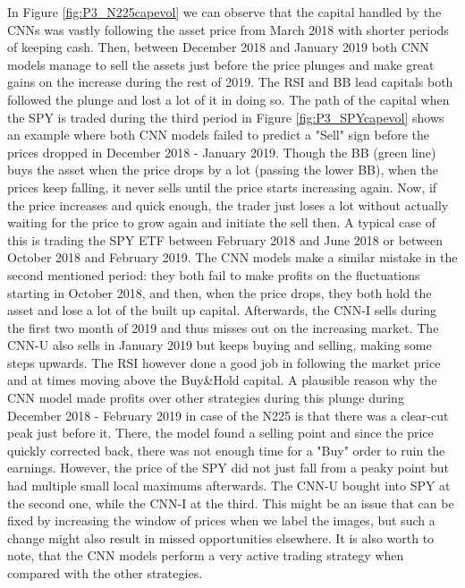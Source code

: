\documentclass[11pt, a4paper]{article}
\begin{document}
In Figure \ref{fig:P3_N225capevol} we can observe that the capital handled by the CNNs was vastly following the asset price from March 2018 with shorter periods of keeping cash. Then, between December 2018 and January 2019 both CNN models manage to sell the assets just before the price plunges and make great gains on the increase during the rest of 2019. The RSI and BB lead capitals both followed the plunge and lost a lot of it in doing so. 
The path of the capital when the SPY is traded during the third period in Figure \ref{fig:P3_SPYcapevol} shows an example where both CNN models failed to predict a "Sell" sign before the prices dropped in December 2018 - January 2019. Though the BB (green line) buys the asset when the price drops by a lot (passing the lower BB), when the prices keep falling, it never sells until the price starts increasing again. Now, if the price increases and quick enough, the trader just loses a lot without actually waiting for the price to grow again and initiate the sell then. A typical case of this is trading the SPY ETF between February 2018 and June 2018 or between October 2018 and February 2019. 
The CNN models make a similar mistake in the second mentioned period: they both fail to make profits on the fluctuations starting in October 2018, and then, when the price drops, they both hold the asset and lose a lot of the built up capital. Afterwards, the CNN-I sells during the first two month of 2019 and thus misses out on the increasing market. The CNN-U also sells in January 2019 but keeps buying and selling, making some steps upwards. The RSI however done a good job in following the market price and at times moving above the Buy\&Hold capital. A plausible reason why the CNN model made profits over other strategies during this plunge during December 2018 - February 2019 in case of the N225 is that there was a clear-cut peak just before it. There, the model found a selling point and since the price quickly corrected back, there was not enough time for a "Buy" order to ruin the earnings. However, the price of the SPY did not just fall from a peaky point but had multiple small local maximums afterwards. The CNN-U bought into SPY at the second one, while the CNN-I at the third. This might be an issue that can be fixed by increasing the window of prices when we label the images, but such a change might also result in missed opportunities elsewhere. It is also worth to note, that the CNN models perform a very active trading strategy when compared with the other strategies.
\end{document}
